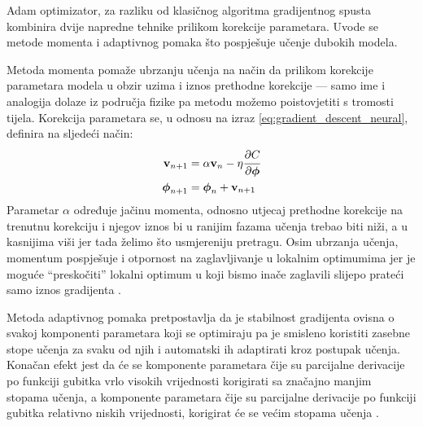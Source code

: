 \documentclass[times, utf8, diplomski, numeric]{fer}
\begin{document}
Adam optimizator, za razliku od klasičnog algoritma gradijentnog spusta kombinira dvije napredne tehnike prilikom korekcije parametara. 
Uvode se metode momenta i adaptivnog pomaka što pospješuje učenje dubokih modela.

Metoda momenta pomaže ubrzanju učenja na način da prilikom korekcije parametara modela u obzir uzima i iznos prethodne korekcije --- samo ime i analogija dolaze iz područja fizike pa metodu možemo poistovjetiti s tromosti tijela.
Korekcija parametara se, u odnosu na izraz \ref{eq:gradient_descent_neural}, definira na sljedeći način:
\begin{align}
\mathbf{v}_{n+1} &= \alpha \mathbf{v}_{n} - \eta \cfrac{\partial C}{\partial \boldsymbol{\phi}} \\
 \boldsymbol{\phi}_{n+1} &= \boldsymbol{\phi}_n + \mathbf{v}_{n+1}
\end{align} 
Parametar $\alpha$ određuje jačinu momenta, odnosno utjecaj prethodne korekcije na trenutnu korekciju i njegov iznos bi u ranijim fazama učenja trebao biti niži, a u kasnijima viši jer tada želimo što usmjereniju pretragu.
Osim ubrzanja učenja, momentum pospješuje i otpornost na zaglavljivanje u lokalnim optimumima jer je moguće ``preskočiti'' lokalni optimum u koji bismo inače zaglavili slijepo prateći samo iznos gradijenta \citep{book:deeplearningbook} \citep{seminar:rela}.

Metoda adaptivnog pomaka pretpostavlja da je stabilnost gradijenta ovisna o svakoj komponenti parametara koji se optimiraju pa je smisleno koristiti zasebne stope učenja za svaku od njih i automatski ih adaptirati kroz postupak učenja.
Konačan efekt jest da će se komponente parametara čije su parcijalne derivacije po funkciji gubitka vrlo visokih vrijednosti korigirati sa značajno manjim stopama učenja, a komponente parametara čije su parcijalne derivacije po funkciji gubitka relativno niskih vrijednosti, korigirat će se većim stopama učenja \citep{book:deeplearningbook} \citep{seminar:rela}.
\end{document}
